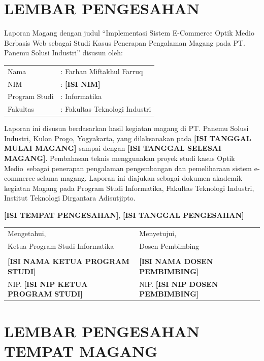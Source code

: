 \documentclass[12pt,a4paper,oneside]{report}
\newcommand{\placeholder}[1]{\textbf{[#1]}}
\newcommand{\namamahasiswa}{Farhan Miftakhul Farruq}
\newcommand{\nimmahasiswa}{\placeholder{ISI NIM}}
\newcommand{\programstudi}{Informatika}
\newcommand{\fakultas}{Fakultas Teknologi Industri}
\newcommand{\kampus}{Institut Teknologi Dirgantara Adisutjipto}
\newcommand{\tempatmagang}{PT. Panemu Solusi Industri}
\newcommand{\lokasimagang}{Kulon Progo, Yogyakarta}
\newcommand{\proyekstudi}{Optik Medio}
\newcommand{\judul}{Implementasi Sistem E-Commerce Optik Medio Berbasis Web sebagai Studi Kasus Penerapan Pengalaman Magang pada PT. Panemu Solusi Industri}
\begin{document}

\chapter*{LEMBAR PENGESAHAN}

Laporan Magang dengan judul ``\judul'' disusun oleh:

\begin{center}
\begin{tabular}{ll}
Nama & : \namamahasiswa \\
NIM & : \nimmahasiswa \\
Program Studi & : \programstudi \\
Fakultas & : \fakultas \\
\end{tabular}
\end{center}

Laporan ini disusun berdasarkan hasil kegiatan magang di \tempatmagang, \lokasimagang, yang dilaksanakan pada \placeholder{ISI TANGGAL MULAI MAGANG} sampai dengan \placeholder{ISI TANGGAL SELESAI MAGANG}. Pembahasan teknis menggunakan proyek studi kasus \proyekstudi\ sebagai penerapan pengalaman pengembangan dan pemeliharaan sistem e-commerce selama magang. Laporan ini diajukan sebagai dokumen akademik kegiatan Magang pada Program Studi \programstudi, \fakultas, \kampus.

\vspace{1cm}
\begin{center}
\placeholder{ISI TEMPAT PENGESAHAN}, \placeholder{ISI TANGGAL PENGESAHAN}
\end{center}

\vspace{0.8cm}
\begin{tabular}{p{}p{}}
Mengetahui, & Menyetujui,\\
Ketua Program Studi \programstudi & Dosen Pembimbing\\
\vspace{2.5cm} & \vspace{2.5cm}\\
\placeholder{ISI NAMA KETUA PROGRAM STUDI} & \placeholder{ISI NAMA DOSEN PEMBIMBING}\\
NIP. \placeholder{ISI NIP KETUA PROGRAM STUDI} & NIP. \placeholder{ISI NIP DOSEN PEMBIMBING}\\
\end{tabular}

\chapter*{LEMBAR PENGESAHAN TEMPAT MAGANG}
\end{document}
